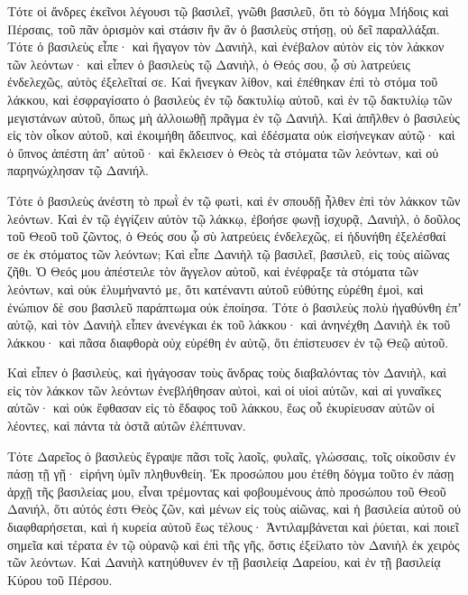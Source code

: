 {\par }{\PP {}Τότε οἱ ἄνδρες ἐκεῖνοι λέγουσι τῷ βασιλεῖ, γνῶθι βασιλεῦ, ὅτι τὸ δόγμα Μήδοις καὶ Πέρσαις, τοῦ πᾶν ὁρισμὸν καὶ στάσιν ἣν ἂν ὁ βασιλεὺς στήσῃ, οὐ δεῖ παραλλάξαι.
Τότε ὁ βασιλεὺς εἶπε· καὶ ἢγαγον τὸν Δανιὴλ, καὶ ἐνέβαλον αὐτὸν εἰς τὸν λάκκον τῶν λεόντων· καὶ εἶπεν ὁ βασιλεὺς τῷ Δανιὴλ, ὁ Θεός σου, ᾧ σὺ λατρεύεις ἐνδελεχῶς, αὐτὸς ἐξελεῖταί σε.
Καὶ ἤνεγκαν λίθον, καὶ ἐπέθηκαν ἐπὶ τὸ στόμα τοῦ λάκκου, καὶ ἐσφραγίσατο ὁ βασιλεὺς ἐν τῷ δακτυλίῳ αὐτοῦ, καὶ ἐν τῷ δακτυλίῳ τῶν μεγιστάνων αὐτοῦ, ὅπως μὴ ἀλλοιωθῇ πρᾶγμα ἐν τῷ Δανιήλ.
Καὶ ἀπῆλθεν ὁ βασιλεὺς εἰς τὸν οἶκον αὐτοῦ, καὶ ἐκοιμήθη ἄδειπνος, καὶ ἐδέσματα οὐκ εἰσήνεγκαν αὐτῷ· καὶ ὁ ὕπνος ἀπέστη ἀπʼ αὐτοῦ· καὶ ἔκλεισεν ὁ Θεὸς τὰ στόματα τῶν λεόντων, καὶ οὐ παρηνώχλησαν τῷ Δανιήλ.
\par }{\PP {}Τότε ὁ βασιλεὺς ἀνέστη τὸ πρωῒ ἐν τῷ φωτὶ, καὶ ἐν σπουδῇ ἦλθεν ἐπὶ τὸν λάκκον τῶν λεόντων.
Καὶ ἐν τῷ ἐγγίζειν αὐτὸν τῷ λάκκῳ, ἐβοήσε φωνῇ ἰσχυρᾷ, Δανιὴλ, ὁ δοῦλος τοῦ Θεοῦ τοῦ ζῶντος, ὁ Θεός σου ᾧ σὺ λατρεύεις ἐνδελεχῶς, εἰ ἠδυνήθη ἐξελέσθαί σε ἐκ στόματος τῶν λεόντων;
Καὶ εἶπε Δανιὴλ τῷ βασιλεῖ, βασιλεῦ, εἰς τοὺς αἰῶνας ζῆθι.
Ὁ Θεός μου ἀπέστειλε τὸν ἄγγελον αὐτοῦ, καὶ ἐνέφραξε τὰ στόματα τῶν λεόντων, καὶ οὐκ ἐλυμήναντό με, ὅτι κατέναντι αὐτοῦ εὐθύτης εὑρέθη ἐμοὶ, καὶ ἐνώπιον δὲ σου βασιλεῦ παράπτωμα οὐκ ἐποίησα.
Τότε ὁ βασιλεὺς πολὺ ἠγαθύνθη ἐπʼ αὐτῷ, καὶ τὸν Δανιὴλ εἶπεν ἀνενέγκαι ἐκ τοῦ λάκκου· καὶ ἀνηνέχθη Δανιὴλ ἐκ τοῦ λάκκου· καὶ πᾶσα διαφθορὰ οὐχ εὑρέθη ἐν αὐτῷ, ὅτι ἐπίστευσεν ἐν τῷ Θεῷ αὐτοῦ.
\par }{\PP {}Καὶ εἶπεν ὁ βασιλεὺς, καὶ ἠγάγοσαν τοὺς ἄνδρας τοὺς διαβαλόντας τὸν Δανιὴλ, καὶ εἰς τὸν λάκκον τῶν λεόντων ἐνεβλήθησαν αὐτοὶ, καὶ οἱ υἱοὶ αὐτῶν, καὶ αἱ γυναῖκες αὐτῶν· καὶ οὐκ ἔφθασαν εἰς τὸ ἔδαφος τοῦ λάκκου, ἕως οὗ ἐκυρίευσαν αὐτῶν οἱ λέοντες, καὶ πάντα τὰ ὀστᾶ αὐτῶν ἐλέπτυναν.
\par }{\PP {}Τότε Δαρεῖος ὁ βασιλεὺς ἔγραψε πᾶσι τοῖς λαοῖς, φυλαῖς, γλώσσαις, τοῖς οἰκοῦσιν ἐν πάσῃ τῇ γῇ· εἰρήνη ὑμῖν πληθυνθείη.
Ἐκ προσώπου μου ἐτέθη δόγμα τοῦτο ἐν πάσῃ ἀρχῇ τῆς βασιλείας μου, εἶναι τρέμοντας καὶ φοβουμένους ἀπὸ προσώπου τοῦ Θεοῦ Δανιήλ, ὅτι αὐτός ἐστι Θεὸς ζῶν, καὶ μένων εἰς τοὺς αἰῶνας, καὶ ἡ βασιλεία αὐτοῦ οὐ διαφθαρήσεται, καὶ ἡ κυρεία αὐτοῦ ἕως τέλους·
Ἀντιλαμβάνεται καὶ ῥύεται, καὶ ποιεῖ σημεῖα καὶ τέρατα ἐν τῷ οὐρανῷ καὶ ἐπὶ τῆς γῆς, ὅστις ἐξείλατο τὸν Δανιὴλ ἐκ χειρὸς τῶν λεόντων.
Καὶ Δανιὴλ κατηύθυνεν ἐν τῇ βασιλείᾳ Δαρείου, καὶ ἐν τῇ βασιλείᾳ Κύρου τοῦ Πέρσου.

}
